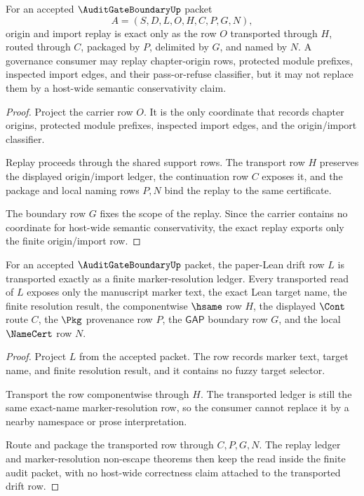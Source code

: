 \begin{theorem}
\label{thm:audit-gate-boundary-origin-import-replay-exactness}
For an accepted $\AuditGateBoundaryUp$ packet
$$
A=(S,D,L,O,H,C,P,G,N),
$$
origin and import replay is exact only as the row $O$ transported through $H$, routed through $C$, packaged by $P$, delimited by $G$, and named by $N$. A governance consumer may replay chapter-origin rows, protected module prefixes, inspected import edges, and their pass-or-refuse classifier, but it may not replace them by a host-wide semantic conservativity claim.
\end{theorem}
\begin{proof}
Project the carrier row $O$. It is the only coordinate that records chapter origins, protected module prefixes, inspected import edges, and the origin/import classifier.

Replay proceeds through the shared support rows. The transport row $H$ preserves the displayed origin/import ledger, the continuation row $C$ exposes it, and the package and local naming rows $P,N$ bind the replay to the same certificate.

The boundary row $G$ fixes the scope of the replay. Since the carrier contains no coordinate for host-wide semantic conservativity, the exact replay exports only the finite origin/import row.
\end{proof}

\begin{theorem}
\label{thm:audit-gate-boundary-drift-row-transport}
For an accepted $\AuditGateBoundaryUp$ packet, the paper-Lean drift row $L$ is transported exactly as a finite marker-resolution ledger. Every transported read of $L$ exposes only the manuscript marker text, the exact Lean target name, the finite resolution result, the componentwise $\hsame$ row $H$, the displayed $\Cont$ route $C$, the $\Pkg$ provenance row $P$, the $\mathsf{GAP}$ boundary row $G$, and the local $\NameCert$ row $N$.
\end{theorem}
\begin{proof}
Project $L$ from the accepted packet. The row records marker text, target name, and finite resolution result, and it contains no fuzzy target selector.

Transport the row componentwise through $H$. The transported ledger is still the same exact-name marker-resolution row, so the consumer cannot replace it by a nearby namespace or prose interpretation.

Route and package the transported row through $C,P,G,N$. The replay ledger and marker-resolution non-escape theorems then keep the read inside the finite audit packet, with no host-wide correctness claim attached to the transported drift row.
\end{proof}

